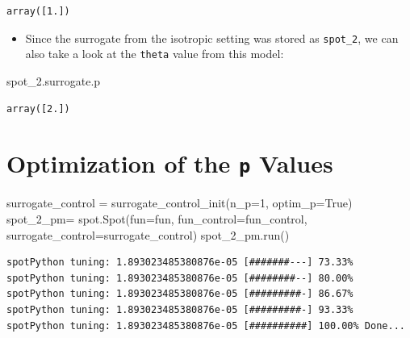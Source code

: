 \documentclass[
  letterpaper,
  DIV=11,
  numbers=noendperiod]{scrreprt}
\newenvironment{Shaded}{\begin{snugshade}}{\end{snugshade}}
\newcommand{\DecValTok}[1]{\textcolor[rgb]{0.68,0.00,0.00}{#1}}
\newcommand{\NormalTok}[1]{\textcolor[rgb]{0.00,0.23,0.31}{#1}}
\newcommand{\OperatorTok}[1]{\textcolor[rgb]{0.37,0.37,0.37}{#1}}
\newcommand{\VariableTok}[1]{\textcolor[rgb]{0.07,0.07,0.07}{#1}}
\providecommand{\tightlist}{%
  \setlength{\itemsep}{0pt}\setlength{\parskip}{0pt}}\usepackage{longtable,booktabs,array}
\begin{document}
\begin{verbatim}
array([1.])
\end{verbatim}

\begin{itemize}
\tightlist
\item
  Since the surrogate from the isotropic setting was stored as
  \texttt{spot\_2}, we can also take a look at the \texttt{theta} value
  from this model:
\end{itemize}

\begin{Shaded}
\begin{Highlighting}[]
\NormalTok{spot\_2.surrogate.p}
\end{Highlighting}
\end{Shaded}

\begin{verbatim}
array([2.])
\end{verbatim}

\section{\texorpdfstring{Optimization of the \texttt{p}
Values}{Optimization of the p Values}}\label{optimization-of-the-p-values}

\begin{Shaded}
\begin{Highlighting}[]
\NormalTok{surrogate\_control }\OperatorTok{=}\NormalTok{ surrogate\_control\_init(n\_p}\OperatorTok{=}\DecValTok{1}\NormalTok{,}
\NormalTok{                                           optim\_p}\OperatorTok{=}\VariableTok{True}\NormalTok{)}
\NormalTok{spot\_2\_pm}\OperatorTok{=}\NormalTok{ spot.Spot(fun}\OperatorTok{=}\NormalTok{fun,}
\NormalTok{                    fun\_control}\OperatorTok{=}\NormalTok{fun\_control,}
\NormalTok{                    surrogate\_control}\OperatorTok{=}\NormalTok{surrogate\_control)}
\NormalTok{spot\_2\_pm.run()}
\end{Highlighting}
\end{Shaded}

\begin{verbatim}
spotPython tuning: 1.893023485380876e-05 [#######---] 73.33% 
spotPython tuning: 1.893023485380876e-05 [########--] 80.00% 
spotPython tuning: 1.893023485380876e-05 [#########-] 86.67% 
spotPython tuning: 1.893023485380876e-05 [#########-] 93.33% 
spotPython tuning: 1.893023485380876e-05 [##########] 100.00% Done...
\end{verbatim}
\end{document}
